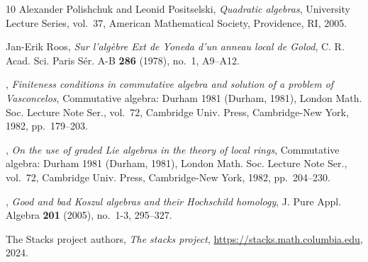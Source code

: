 \documentclass{amsart}
\numberwithin{equation}{section}
\theoremstyle{plain}
\theoremstyle{definition}
\theoremstyle{remark}
\begin{document}
\begin{thebibliography}{10}
Alexander Polishchuk and Leonid Positselski, \emph{Quadratic algebras},
  University Lecture Series, vol.~37, American Mathematical Society,
  Providence, RI, 2005. 

Jan-Erik Roos, \emph{Sur l'alg\`ebre {E}xt de {Y}oneda d'un anneau local de
  {G}olod}, C. R. Acad. Sci. Paris S\'er. A-B \textbf{286} (1978), no.~1,
  A9--A12. 

\bysame, \emph{Finiteness conditions in commutative algebra and solution of a
  problem of {V}asconcelos}, Commutative algebra: {D}urham 1981 ({D}urham,
  1981), London Math. Soc. Lecture Note Ser., vol.~72, Cambridge Univ. Press,
  Cambridge-New York, 1982, pp.~179--203. 

\bysame, \emph{On the use of graded {L}ie algebras in the theory of local
  rings}, Commutative algebra: {D}urham 1981 ({D}urham, 1981), London Math.
  Soc. Lecture Note Ser., vol.~72, Cambridge Univ. Press, Cambridge-New York,
  1982, pp.~204--230. 

\bysame, \emph{Good and bad {K}oszul algebras and their {H}ochschild homology},
  J. Pure Appl. Algebra \textbf{201} (2005), no.~1-3, 295--327. 

The {Stacks project authors}, \emph{The stacks project},
  \url{https://stacks.math.columbia.edu}, 2024.

\end{thebibliography}

 
\end{document}
